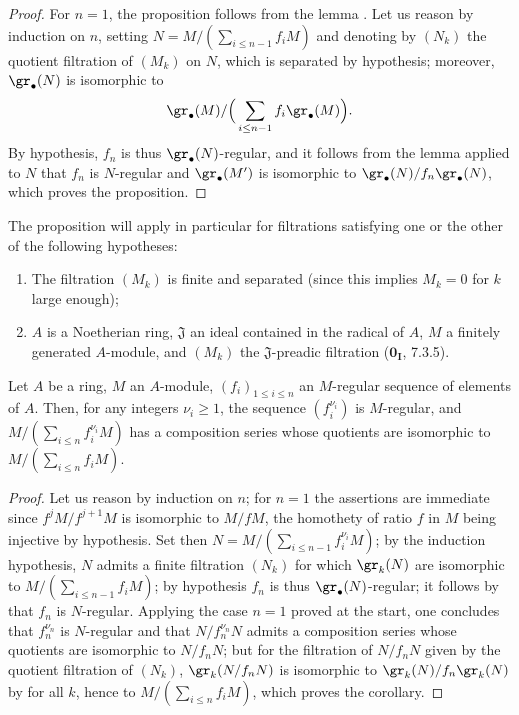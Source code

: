 \begin{proof}
For $n=1$, the proposition follows from the lemma .
Let us reason by induction on $n$, setting $N=M/(\sum_{i\leq n-1}f_iM)$ and denoting by $(N_k)$ the quotient filtration of $(M_k)$ on $N$, which is separated by hypothesis;
moreover, $\gr_\bullet(N)$ is isomorphic to
\[
  \gr_\bullet(M)/\Big(\sum_{i\leq n-1}f_i\gr_\bullet(M)\Big).
\]
By hypothesis, $f_n$ is thus $\gr_\bullet(N)$-regular, and it follows from the lemma  applied to $N$ that $f_n$ is $N$-regular and $\gr_\bullet(M')$ is isomorphic to $\gr_\bullet(N)/f_n\gr_\bullet(N)$, which proves the proposition.
\end{proof}

The proposition  will apply in particular for filtrations satisfying one or the other of the following hypotheses:
\begin{enumerate}
  \item[$1^\circ$] The filtration $(M_k)$ is finite and separated (since this implies $M_k=0$ for $k$ large enough);
  \item[$2^\circ$] $A$ is a Noetherian ring, $\mathfrak{J}$ an ideal contained in the radical of $A$, $M$ a finitely generated $A$-module, and $(M_k)$ the $\mathfrak{J}$-preadic filtration ($\mathbf{0_I}$, 7.3.5).
\end{enumerate}

\begin{corollary}[15.1.20]
\label{0.15.1.20}
Let $A$ be a ring, $M$ an $A$-module, $(f_i)_{1\leq i\leq n}$ an $M$-regular sequence of elements of $A$.
Then, for any integers $\nu_i\geq 1$, the sequence $(f_i^{\nu_i})$ is $M$-regular, and $M/(\sum_{i\leq n}f_i^{\nu_i}M)$ has a composition series whose quotients are isomorphic to $M/(\sum_{i\leq n}f_iM)$.
\end{corollary}

\begin{proof}
Let us reason by induction on $n$;
for $n=1$ the assertions are immediate since $f^jM/f^{j+1}M$ is isomorphic to $M/fM$, the homothety of ratio $f$ in $M$ being injective by hypothesis.
Set then $N=M/(\sum_{i\leq n-1}f_i^{\nu_i}M)$;
by the induction hypothesis, $N$ admits a finite filtration $(N_k)$ for which $\gr_k(N)$ are isomorphic to $M/(\sum_{i\leq n-1}f_iM)$;
by hypothesis $f_n$ is thus $\gr_\bullet(N)$-regular;
it follows by  that $f_n$ is $N$-regular.
Applying the case $n=1$ proved at the start, one concludes that $f_n^{\nu_n}$ is $N$-regular and that $N/f_n^{\nu_n}N$ admits a composition series whose quotients are isomorphic to $N/f_nN$;
but for the filtration of $N/f_nN$ given by the quotient filtration of $(N_k)$, $\gr_k(N/f_nN)$ is isomorphic to $\gr_k(N)/f_n\gr_k(N)$ by  for all $k$, hence to $M/(\sum_{i\leq n}f_iM)$, which proves the corollary.
\end{proof}

